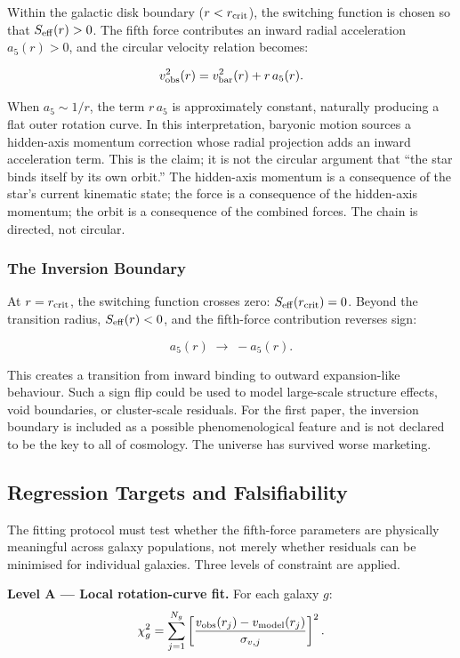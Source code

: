 \documentclass[11pt,a4paper]{article}
\newcommand{\afiver}{a_5}                    %
\newcommand{\Seff}{S_{\rm eff}}              %
\newcommand{\rcrit}{r_{\rm crit}}            %
\newcommand{\vobs}{v_{\rm obs}}              %
\newcommand{\vbar}{v_{\rm bar}}              %
\newcommand{\vmod}{v_{\rm model}}            %
\begin{document}
Within the galactic disk boundary ($r < \rcrit$), the switching function is
chosen so that $\Seff(r) > 0$.  The fifth force contributes an inward radial
acceleration $\afiver(r) > 0$, and the circular velocity relation becomes:

\[
  \vobs^2(r) = \vbar^2(r) + r\,\afiver(r) .
\]

When $\afiver \sim 1/r$, the term $r\,\afiver$ is approximately constant,
naturally producing a flat outer rotation curve.  In this interpretation,
baryonic motion sources a hidden-axis momentum correction whose radial
projection adds an inward acceleration term.  This is the claim; it is not
the circular argument that ``the star binds itself by its own orbit.''
The hidden-axis momentum is a consequence of the star's current kinematic
state; the force is a consequence of the hidden-axis momentum; the orbit is
a consequence of the combined forces.  The chain is directed, not circular.

\subsubsection{The Inversion Boundary}

At $r = \rcrit$, the switching function crosses zero: $\Seff(\rcrit) = 0$.
Beyond the transition radius, $\Seff(r) < 0$, and the fifth-force contribution
reverses sign:

\[
  \afiver(r) \;\to\; -\afiver(r) .
\]

This creates a transition from inward binding to outward expansion-like
behaviour.  Such a sign flip could be used to model large-scale structure
effects, void boundaries, or cluster-scale residuals.  For the first paper,
the inversion boundary is included as a possible phenomenological feature and
is not declared to be the key to all of cosmology.  The universe has survived
worse marketing.

\subsection{Regression Targets and Falsifiability}\label{sec:falsifiability}

The fitting protocol must test whether the fifth-force parameters are
physically meaningful across galaxy populations, not merely whether residuals
can be minimised for individual galaxies.  Three levels of constraint are
applied.

\textbf{Level A --- Local rotation-curve fit.}
For each galaxy $g$:
\[
  \chi^2_g = \sum_{j=1}^{N_g}
  \left[\frac{\vobs(r_j) - \vmod(r_j)}{\sigma_{v,j}}\right]^2 .
\]
\end{document}
